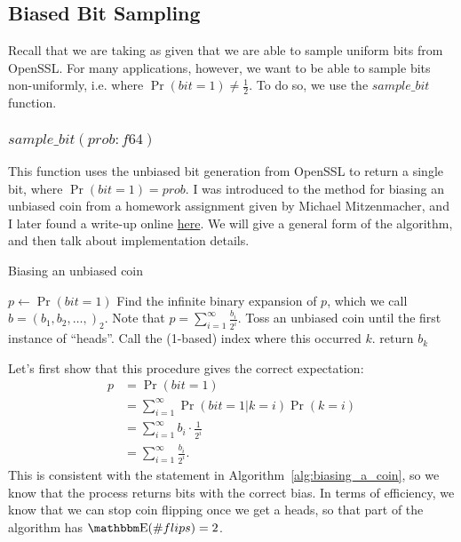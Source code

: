 \documentclass[11pt]{scrartcl} %
\begin{document}
\subsection{Biased Bit Sampling}
Recall that we are taking as given that we are able to sample uniform bits from OpenSSL.
For many applications, however, we want to be able to sample bits non-uniformly,
i.e. where $\Pr(bit = 1) \neq \frac{1}{2}$. To do so, we use the $sample\_bit$ function.

\subsubsection{$sample\_bit(prob: f64)$}
This function uses the unbiased bit generation from OpenSSL to return a single bit, where $\Pr(bit = 1) = prob$.
I was introduced to the method for biasing an unbiased coin from a homework assignment given by Michael Mitzenmacher,
and I later found a write-up online \href{https://amakelov.wordpress.com/2013/10/10/arbitrarily-biasing-a-coin-in-2-expected-tosses/}{here}.
We will give a general form of the algorithm, and then talk about implementation details.
\begin{algorithm}[H]
	\caption{Biasing an unbiased coin}
	\label{alg:biasing_a_coin}
	\begin{algorithmic}[1]
		\State $p \gets \Pr(bit = 1)$
		\State Find the infinite binary expansion of $p$, which we call $b = (b_1, b_2, \hdots,)_2$.
		Note that $p = \sum_{i=1}^{\infty}\frac{b_i}{2^i}$.
		\State Toss an unbiased coin until the first instance of ``heads''. Call the (1-based) index where this occurred $k$.
		\State return $b_k$
	\end{algorithmic}
\end{algorithm}
Let's first show that this procedure gives the correct expectation:
\begin{align*}
	p &= \Pr(bit = 1) \\
		 &= \sum_{i=1}^{\infty} \Pr(bit = 1 \vert k = i) \Pr(k = i) \\
		 &= \sum_{i=1}^{\infty} b_i \cdot \frac{1}{2^i} \\
		 &= \sum_{i=1}^{\infty}\frac{b_i}{2^i}.
\end{align*}
This is consistent with the statement in Algorithm~\ref{alg:biasing_a_coin}, so we know that
the process returns bits with the correct bias.
In terms of efficiency, we know that we can stop coin flipping once we get a heads,
so that part of the algorithm has $\E(\# flips) = 2$. \newline
\end{document}
